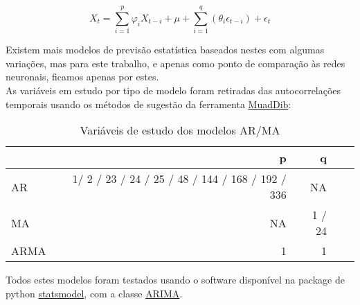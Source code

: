 \begin{equation} \label{eq:arma} 
    X_{t} = \sum_{i=1}^{p}\varphi_{i} X_{t-i}  + \mu + \sum_{i=1}^{q}(\theta_{i} \epsilon_{t-i}) + \epsilon_{t}
\end{equation}
\smallskip

Existem mais modelos de previsão estatística baseados nestes com algumas variações, mas para este trabalho, e apenas como ponto de comparação às redes neuronais, ficamos apenas por estes.\\
As variáveis em estudo por tipo de modelo foram retiradas das autocorrelações temporais usando os métodos de sugestão da ferramenta \hyperref[se:muaddib]{MuadDib}:\\


\begin{table}[h] \centering
\begin{tabular}{lrrrr}
    \toprule
     & p & q \\
    \midrule
    \gls{AR} & 1/ 2 / 23 / 24 / 25 / 48 / 144 / 168 / 192 / 336 & NA \\
    \gls{MA} & NA & 1 / 24 \\
    \gls{ARMA} & 1 & 1 \\
    \bottomrule
    \end{tabular}
    \label{tab:varsstats} 
    \caption{Variáveis de estudo dos modelos AR/MA}
\end{table}


Todos estes modelos foram testados usando o software disponível na package de python \href{https://www.statsmodels.org/stable/index.html}{statsmodel}, com a classe \href{https://www.statsmodels.org/stable/generated/statsmodels.tsa.arima.model.ARIMA.html}{ARIMA}.
